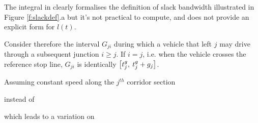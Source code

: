 The integral in  clearly formalises the definition of slack bandwidth illustrated in Figure \ref{f:slackdef}.a but it's not practical to compute, and does not provide an explicit form for $l(t)$.


Consider therefore the interval $G_{ji}$ during which a vehicle that left $j$ may drive through a subsequent junction $i \geqslant j$. If $i = j$, i.e. when the vehicle crosses the reference stop line, $G_{ji}$ is identically $\left[ t_{j}^{\scriptstyle{g}}, \: t_{j}^{\scriptstyle{g}}+g_{j} \right] $.



Assuming constant speed along the $j^{th}$ corridor section

instead of 

which leads to a variation on 